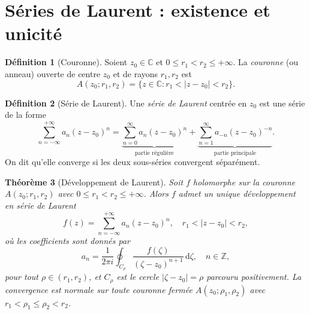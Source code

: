 \documentclass[12pt,a4paper,openany]{book}
\theoremstyle{definition}
\newtheorem{definition}{Définition}[chapter]
\theoremstyle{plain}
\newtheorem{theoreme}[definition]{Théorème}
\theoremstyle{remark}
\newcommand{\C}{\mathbb{C}}
\newcommand{\Z}{\mathbb{Z}}
\newcommand{\dd}{\mathrm{d}}
\newcommand{\abs}[1]{\left|#1\right|}
\begin{document}
\section{Séries de Laurent : existence et unicité}

\begin{definition}[Couronne]\label{def:annulus}
Soient $z_0 \in \C$ et $0 \leq r_1 < r_2 \leq +\infty$. La
\emph{couronne} (ou anneau) ouverte de centre $z_0$ et de rayons
$r_1, r_2$ est
\[
  A(z_0; r_1, r_2) = \{z \in \C : r_1 < \abs{z - z_0} < r_2\}.
\]
\end{definition}

\begin{center}
\end{center}

\begin{definition}[Série de Laurent]\label{def:laurent-series}
Une \emph{série de Laurent} centrée en $z_0$ est une série de la forme
\[
  \sum_{n=-\infty}^{+\infty} a_n (z - z_0)^n
  = \underbrace{\sum_{n=0}^{\infty} a_n (z-z_0)^n}_{\text{partie régulière}}
  + \underbrace{\sum_{n=1}^{\infty} a_{-n} (z-z_0)^{-n}}_{\text{partie principale}}.
\]
On dit qu'elle converge si les deux sous-séries convergent séparément.
\end{definition}

\begin{theoreme}[Développement de Laurent]\label{thm:laurent}
Soit $f$ holomorphe sur la couronne $A(z_0; r_1, r_2)$ avec
$0 \leq r_1 < r_2 \leq +\infty$. Alors $f$ admet un unique
développement en série de Laurent
\[
  f(z) = \sum_{n=-\infty}^{+\infty} a_n(z - z_0)^n,
  \quad r_1 < \abs{z - z_0} < r_2,
\]
où les coefficients sont donnés par
\[
  a_n = \frac{1}{2\pi i}\oint_{C_\rho}
  \frac{f(\zeta)}{(\zeta - z_0)^{n+1}}\,\dd\zeta,
  \quad n \in \Z,
\]
pour tout $\rho \in (r_1, r_2)$, et $C_\rho$ est le cercle
$\abs{\zeta - z_0} = \rho$ parcouru positivement. La convergence est
normale sur toute couronne fermée $A(z_0; \rho_1, \rho_2)$ avec
$r_1 < \rho_1 \leq \rho_2 < r_2$.
\end{theoreme}
\end{document}
